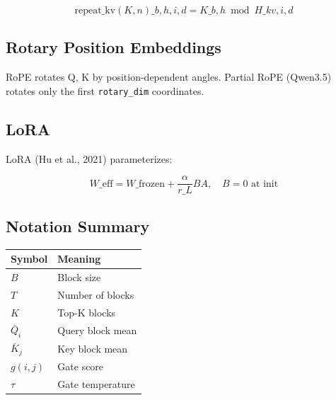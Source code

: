 \[
\text{repeat\_kv}(K, n)\_{b, h, i, d} = K\_{b, h \bmod H\_{kv}, i, d}
\tag{3.3}
\]

\subsection{Rotary Position Embeddings}

RoPE rotates Q, K by position-dependent angles. Partial RoPE (Qwen3.5) 
rotates only the first \texttt{rotary\_dim} coordinates.

\subsection{LoRA}

LoRA (Hu et al., 2021) parameterizes:

\[
W\_\text{eff} = W\_\text{frozen} + \frac{\alpha}{r\_L} B A, \quad B = 0 \text{ at init}
\tag{3.4}
\]

\subsection{Notation Summary}

\begin{table}[H]
\centering
\small
\begin{tabular}{ll}
\toprule
\textbf{Symbol} & \textbf{Meaning} \\
\midrule
$B$ & Block size \\
$T$ & Number of blocks \\
$K$ & Top-K blocks \\
$\bar{Q}_i$ & Query block mean \\
$\bar{K}_j$ & Key block mean \\
$g(i, j)$ & Gate score \\
$\tau$ & Gate temperature \\
\bottomrule
\end{tabular}
\end{table}

